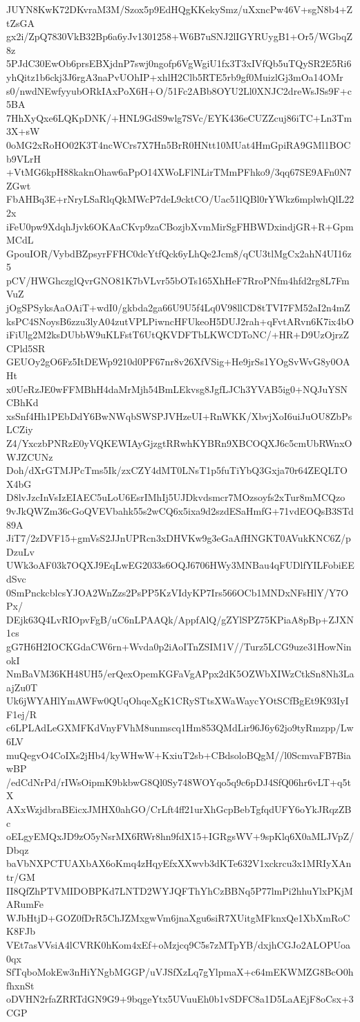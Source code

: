 JUYN8KwK72DKvraM3M/Szox5p9EdHQgKKekySmz/uXxncPw46V+sgN8b4+ZtZsGA
gx2i/ZpQ7830VkB32Bp6a6yJv1301258+W6B7uSNJ2lIGYRUygB1+Or5/WGbqZ8z
5PJdC30EwOb6prsEBXjdnP7swj0ngofp6VgWgiU1fx3T3xIVfQb5uTQySR2E5Ri6
yhQitz1b6ckj3J6rgA3naPvUOhIP+xhlH2Clb5RTE5rb9gf0MuizlGj3mOa14OMr
s0/nwdNEwfyyubORkIAxPoX6H+O/51Fc2ABb8OYU2Ll0XNJC2dreWsJSs9F+c5BA
7HhXyQxe6LQKpDNK/+HNL9GdS9wlg7SVc/EYK436eCUZZcuj86iTC+Ln3Tm3X+sW
0oMG2xRoHO02K3T4ncWCrs7X7Hn5BrR0HNtt10MUat4HmGpiRA9GMl1BOCb9VLrH
+VtMG6kpH88kaknOhaw6aPpO14XWoLFlNLirTMmPFhko9/3qq67SE9AFn0N7ZGwt
FbAHBq3E+rNryLSaRlqQkMWcP7deL9cktCO/Uac51lQBl0rYWkz6mplwhQlL222x
iFeU0pw9XdqhJjvk6OKAaCKvp9zaCBozjbXvmMirSgFHBWDxindjGR+R+GpmMCdL
GpouIOR/VybdBZpsyrFFHC0dcYtfQck6yLhQe2Jcm8/qCU3tlMgCx2ahN4UI16z5
pCV/HWGhczglQvrGNO81K7bVLvr55bOTs165XhHeF7RroPNfm4hfd2rg8L7FmVuZ
jOgSPSyksAaOAiT+wdI0/gkbda2ga66U9U5f4Lq0V98llCD8tTVI7FM52aI2n4mZ
ksPC4SNoysB6zzu3lyA04zutVPLPiwncHFUkeoH5DUJ2rah+qFvtARvn6K7ix4bO
iFiUlg2M2ksDUbbW9uKLFstT6UtQKVDFTbLKWCDToNC/+HR+D9UzOjrzZCPld5SR
GEUOy2gO6Fz5ItDEWp9210d0PF67nr8v26XfVSig+He9jrSs1YOgSvWvG8y0OAHt
x0UeRzJE0wFFMBhH4daMrMjh54BmLEkvsg8JgfLJCh3YVAB5ig0+NQJuYSNCBhKd
xsSnf4Hh1PEbDdY6BwNWqbSWSPJVHzeUI+RnWKK/XbvjXoI6uiJuOU8ZbPsLCZiy
Z4/YxczbPNRzE0yVQKEWIAyGjzgtRRwhKYBRn9XBCOQXJ6c5cmUbRWnxOWJZCUNz
Doh/dXrGTMJPcTms5Ik/zxCZY4dMT0LNsT1p5fuTiYbQ3Gxja70r64ZEQLTOX4bG
D8lvJzcInVsIzEIAEC5uLoU6EsrIMhIj5UJDkvdsmcr7MOzsoyfs2xTur8mMCQzo
9vJkQWZm36cGoQVEVbahk55s2wCQ6x5ixa9d2szdESaHmfG+71vdEOQsB3STd89A
JiT7/2zDVF15+gmVsS2JJnUPRcn3xDHVKw9g3eGaAfHNGKT0AVukKNC6Z/pDzuLv
UWk3oAF03k7OQXJ9EqLwEG2033s6OQJ6706HWy3MNBau4qFUDlfYILFobiEEdSvc
0SmPnckcblcsYJOA2WnZzs2PsPP5KzVIdyKP7Irs566OCb1MNDxNFsHlY/Y7OPx/
DEjk63Q4LvRIOpvFgB/uC6nLPAAQk/AppfAlQ/gZYlSPZ75KPiaA8pBp+ZJXN1cs
gG7H6H2IOCKGdaCW6rn+Wvda0p2iAoITnZSIM1V//Turz5LCG9uze31HowNinokI
NmBaVM36KH48UH5/erQexOpemKGFaVgAPpx2dK5OZWbXIWzCtkSn8Nh3LaajZu0T
Uk6jWYAHlYmAWFw0QUqOhqeXgK1CRySTtsXWaWaycYOtSCfBgEt9K93IyIF1ej/R
c6LPLAdLeGXMFKdVnyFVhM8unmscq1Hm853QMdLir96J6y62jo9tyRmzpp/Lw6LV
muQegvO4CoIXs2jHb4/kyWHwW+KxiuT2sb+CBdsoloBQgM//l0ScmvaFB7BiawBP
/edCdNrPd/rIWsOipmK9bkbwG8Ql0Sy748WOYqo5q9c6pDJ4SfQ06hr6vLT+q5tX
AXxWzjdbraBEicxJMHX0ahGO/CrLft4ff21urXhGcpBebTgfqdUFY6oYkJRqzZBc
oELgyEMQxJD9zO5yNsrMX6RWr8hn9fdX15+IGRgsWV+9spKlq6X0aMLJVpZ/Dbqz
baVbNXPCTUAXbAX6oKmq4zHqyEfxXXwvb3dKTe632V1xckrcu3x1MRIyXAntr/GM
II8QfZhPTVMIDOBPKd7LNTD2WYJQFThYhCzBBNq5P77lmPi2hhuYlxPKjMARumFe
WJbHtjD+GOZ0fDrR5ChJZMxgwVm6jnaXgu6siR7XUitgMFknxQe1XbXmRoCK8FJb
VEt7asVVsiA4lCVRK0hKom4xEf+oMzjcq9C5s7zMTpYB/dxjhCGJo2ALOPUoa0qx
SfTqboMokEw3nHiYNgbMGGP/uVJSfXzLq7gYlpmaX+c64mEKWMZG8BcO0hfhxnSt
oDVHN2rfaZRRTdGN9G9+9bqgeYtx5UVuuEh0b1vSDFC8a1D5LaAEjF8oCsx+3CGP

